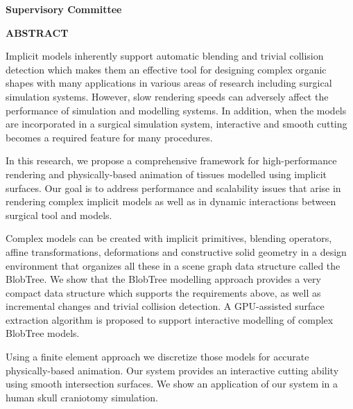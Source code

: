 \pagebreak
\newpage
{}

\noindent \textbf{Supervisory Committee}
\tpbreak
\panel

\begin{center}
\textbf{ABSTRACT}
\end{center}
Implicit models inherently support automatic blending and trivial collision detection 
which makes them an effective tool for designing complex organic shapes with many applications in 
various areas of research including surgical simulation systems. However, slow rendering speeds can 
adversely affect the performance of simulation and modelling systems. In addition, when the models are 
incorporated in a surgical simulation system, interactive and smooth cutting becomes a required feature 
for many procedures.

In this research, we propose a comprehensive framework for high-performance rendering
and physically-based animation of tissues modelled using implicit surfaces. Our 
goal is to address performance and scalability issues that arise in rendering 
complex implicit models as well as in dynamic interactions between surgical tool and models. 


Complex models can be created with implicit primitives, blending operators, affine
transformations, deformations and constructive solid geometry in a design environment that organizes
all these in a scene graph data structure called the BlobTree. We show that the
BlobTree modelling approach provides a very compact data structure which supports 
the requirements above, as well as incremental changes and trivial collision detection.
A GPU-assisted surface extraction algorithm is proposed to support interactive modelling of complex 
BlobTree models.

Using a finite element approach we discretize those models for accurate physically-based animation. 
Our system provides an interactive cutting ability using smooth intersection surfaces.
We show an application of our system in a human skull craniotomy simulation.


\pagebreak


